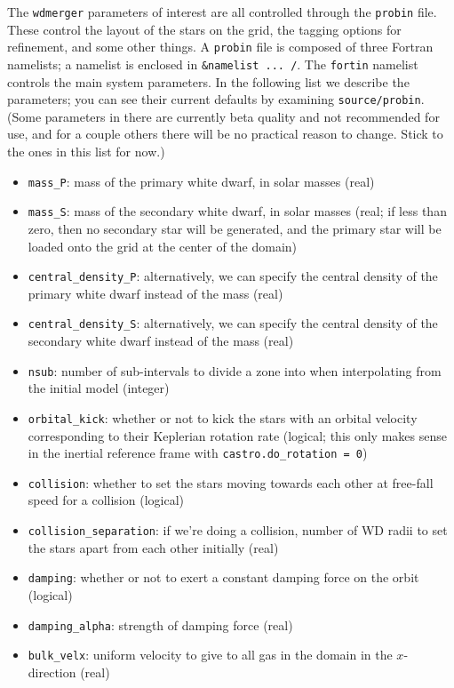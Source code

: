 \documentclass[12pt]{book}
\begin{document}
The \texttt{wdmerger} parameters of interest are all controlled through the \texttt{probin} file. 
These control the layout of the stars on the grid, the tagging options for refinement, and some other things. 
A \texttt{probin} file is composed of three Fortran namelists; a namelist is enclosed in 
\texttt{\&namelist ... /}. The \texttt{fortin} namelist controls the main system parameters. 
In the following list we describe the parameters; you can see their current defaults by 
examining \texttt{source/probin}. (Some parameters in there are currently beta quality and 
not recommended for use, and for a couple others there will be no practical reason to change. 
Stick to the ones in this list for now.)
\begin{itemize}
  \item \texttt{mass\_P}: mass of the primary white dwarf, in solar masses (real)
  \item \texttt{mass\_S}: mass of the secondary white dwarf, in solar masses (real; if less than zero, 
    then no secondary star will be generated, and the primary star will be loaded onto the grid at the 
    center of the domain)
  \item \texttt{central\_density\_P}: alternatively, we can specify the central density of the primary white dwarf instead of the mass (real)
  \item \texttt{central\_density\_S}: alternatively, we can specify the central density of the secondary white dwarf instead of the mass (real)
  \item \texttt{nsub}: number of sub-intervals to divide a zone into when interpolating from the initial model (integer)
  \item \texttt{orbital\_kick}: whether or not to kick the stars with an orbital velocity corresponding to their 
    Keplerian rotation rate (logical; this only makes sense in the inertial reference frame with \texttt{castro.do\_rotation = 0})
  \item \texttt{collision}: whether to set the stars moving towards each other at free-fall speed for a collision (logical)
  \item \texttt{collision\_separation}: if we're doing a collision, number of WD radii to set the stars apart from each other initially (real)
  \item \texttt{damping}: whether or not to exert a constant damping force on the orbit (logical)
  \item \texttt{damping\_alpha}: strength of damping force (real)
  \item \texttt{bulk\_velx}: uniform velocity to give to all gas in the domain in the $x$-direction (real)

\end{itemize}
\end{document}
